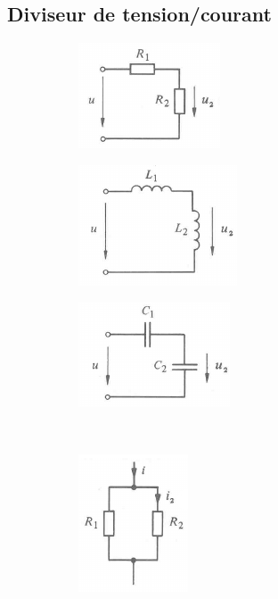 \documentclass[12pt,a4paper]{article}
\begin{document}
\subsection{Diviseur de tension/courant}
\label{subsection: diviseur courant/tension}
\begin{figure}
	\centering
	\begin{subfigure}[b]{0.3\textwidth}
		\centering
		\includegraphics[scale=0.9]{images/diviseur_tension_r}
		\caption{}
		\label{subfig: diviseur tension R}
	\end{subfigure}
	\begin{subfigure}[b]{0.3\textwidth}
		\centering
		\includegraphics[scale=0.8]{images/diviseur_tension_l}
		\caption{}
		\label{subfig: diviseur tension L}
	\end{subfigure}
	\begin{subfigure}[b]{0.3\textwidth}
		\centering
		\includegraphics[scale=0.95]{images/diviseur_tension_c}
		\caption{}
		\label{subfig: diviseur tension C}
	\end{subfigure}\\
	\begin{subfigure}[b]{0.3\textwidth}
		\centering
		\includegraphics[scale=0.8]{images/diviseur_courant_r}

\end{subfigure}
\end{figure}
\end{document}
